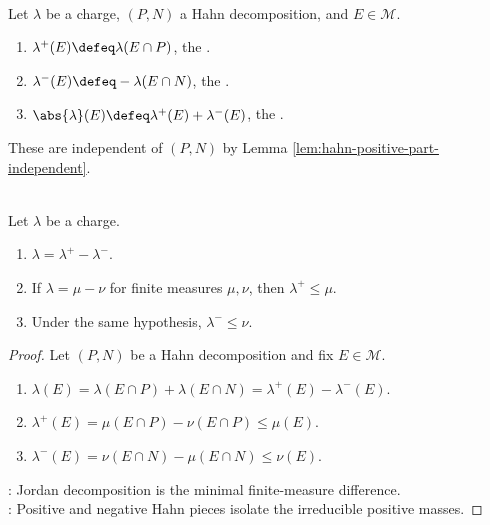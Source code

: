 \begin{definition} \label{def:jordan-positive-negative-total-variation} \\
Let $\lambda$ be a charge, $(P,N)$ a Hahn decomposition, and $E\in\mathcal{M}$.
\begin{enumerate}[label=(\roman*)]
\setlength{\itemsep}{0pt}
\item $\lambda^+(E)\defeq\lambda(E\cap P)$, the .
\item $\lambda^-(E)\defeq-\lambda(E\cap N)$, the .
\item $\abs{\lambda}(E)\defeq\lambda^+(E)+\lambda^-(E)$, the .
\end{enumerate}
These are independent of $(P,N)$ by Lemma \ref{lem:hahn-positive-part-independent}.
\end{definition}

\begin{theorem} \label{thm:jordan-decomposition-charge} \\
Let $\lambda$ be a charge.
\begin{enumerate}[label=(\roman*)]
\setlength{\itemsep}{0pt}
\item $\lambda=\lambda^+-\lambda^-$.
\item If $\lambda=\mu-\nu$ for finite measures $\mu,\nu$, then $\lambda^+\leq\mu$.
\item Under the same hypothesis, $\lambda^-\leq\nu$.
\end{enumerate}
\begin{proof}
Let $(P,N)$ be a Hahn decomposition and fix $E\in\mathcal{M}$.
\begin{enumerate}[label=(\roman*)]
\setlength{\itemsep}{0pt}
\item $\lambda(E)=\lambda(E\cap P)+\lambda(E\cap N)=\lambda^+(E)-\lambda^-(E)$.
\item $\lambda^+(E)=\mu(E\cap P)-\nu(E\cap P)\leq\mu(E)$.
\item $\lambda^-(E)=\nu(E\cap N)-\mu(E\cap N)\leq\nu(E)$.
\end{enumerate}
: Jordan decomposition is the minimal finite-measure difference.\\
: Positive and negative Hahn pieces isolate the irreducible positive masses.
\end{proof}
\end{theorem}

